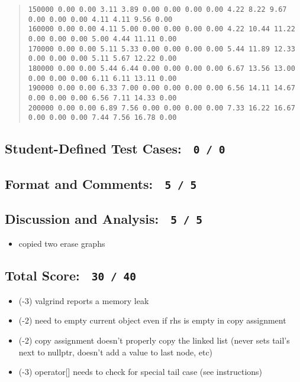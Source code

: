 \documentclass[10pt]{article}
\newcommand{\spc}{\vspace{12pt}}
\def \SCORETESTS    {0 / 0}
\def \SCOREFORMAT   {5 / 5}
\def \SCOREANALYSIS {5 / 5}
\def \SCORETOTAL    {30 / 40}
\begin{document}
\begin{itemize}
\begin{scriptsize}
\begin{quote}
\begin{verbatim}
150000 0.00 0.00 3.11 3.89 0.00 0.00 0.00 0.00 4.22 8.22 9.67 0.00 0.00 0.00 4.11 4.11 9.56 0.00
160000 0.00 0.00 4.11 5.00 0.00 0.00 0.00 0.00 4.22 10.44 11.22 0.00 0.00 0.00 5.00 4.44 11.11 0.00
170000 0.00 0.00 5.11 5.33 0.00 0.00 0.00 0.00 5.44 11.89 12.33 0.00 0.00 0.00 5.11 5.67 12.22 0.00
180000 0.00 0.00 5.44 6.44 0.00 0.00 0.00 0.00 6.67 13.56 13.00 0.00 0.00 0.00 6.11 6.11 13.11 0.00
190000 0.00 0.00 6.33 7.00 0.00 0.00 0.00 0.00 6.56 14.11 14.67 0.00 0.00 0.00 6.56 7.11 14.33 0.00
200000 0.00 0.00 6.89 7.56 0.00 0.00 0.00 0.00 7.33 16.22 16.67 0.00 0.00 0.00 7.44 7.56 16.78 0.00
\end{verbatim}
\end{quote}
\end{scriptsize}
\end{itemize}

\subsection*{Student-Defined Test Cases:~ {\tt \SCORETESTS}}

\subsection*{Format and Comments:~ {\tt \SCOREFORMAT}}

\subsection*{Discussion and Analysis:~ {\tt \SCOREANALYSIS}}
\begin{itemize}
\item copied two erase graphs
\end{itemize}
\spc

\noindent\hrulefill
\vspace{-12pt}
\subsection*{Total Score:~ {\tt \SCORETOTAL}}
\begin{itemize}
\item (-3) valgrind reports a memory leak
\item (-2) need to empty current object even if rhs is empty in copy
  assignment
\item (-2) copy assignment doesn't properly copy the linked list
  (never sets tail's next to nullptr, doesn't add a value to last
  node, etc)
\item (-3) operator[] needs to check for special tail case (see
  instructions)
\end{itemize}

\vspace{-12pt}
\noindent\hrulefill
\end{document}
